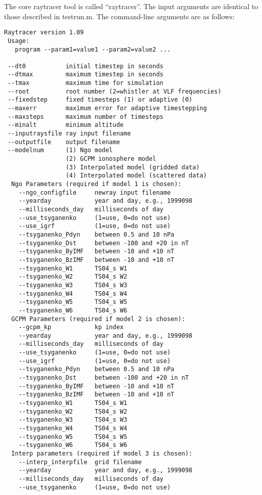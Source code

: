 \documentclass[10pt]{article}
\begin{document}
The core raytracer tool is called ``raytracer''.  The input arguments
are identical to those described in testrun.m.  The command-line
arguments are as follows:

\begin{verbatim}
Raytracer version 1.09
 Usage:
   program --param1=value1 --param2=value2 ...
   
 --dt0           initial timestep in seconds
 --dtmax         maximum timestep in seconds
 --tmax          maximum time for simulation
 --root          root number (2=whistler at VLF frequencies)
 --fixedstep     fixed timesteps (1) or adaptive (0)
 --maxerr        maximum error for adaptive timestepping
 --maxsteps      maximum number of timesteps
 --minalt        minimum altitude
 --inputraysfile ray input filename
 --outputfile    output filename
 --modelnum      (1) Ngo model
                 (2) GCPM ionosphere model
                 (3) Interpolated model (gridded data)
                 (4) Interpolated model (scattered data)
  Ngo Parameters (required if model 1 is chosen):
    --ngo_configfile     newray input filename
    --yearday            year and day, e.g., 1999098
    --milliseconds_day   milliseconds of day
    --use_tsyganenko     (1=use, 0=do not use)
    --use_igrf           (1=use, 0=do not use)
    --tsyganenko_Pdyn    between 0.5 and 10 nPa
    --tsyganenko_Dst     between -100 and +20 in nT
    --tsyganenko_ByIMF   between -10 and +10 nT
    --tsyganenko_BzIMF   between -10 and +10 nT
    --tsyganenko_W1      TS04_s W1
    --tsyganenko_W2      TS04_s W2
    --tsyganenko_W3      TS04_s W3
    --tsyganenko_W4      TS04_s W4
    --tsyganenko_W5      TS04_s W5
    --tsyganenko_W6      TS04_s W6
  GCPM Parameters (required if model 2 is chosen):
    --gcpm_kp            kp index
    --yearday            year and day, e.g., 1999098
    --milliseconds_day   milliseconds of day
    --use_tsyganenko     (1=use, 0=do not use)
    --use_igrf           (1=use, 0=do not use)
    --tsyganenko_Pdyn    between 0.5 and 10 nPa
    --tsyganenko_Dst     between -100 and +20 in nT
    --tsyganenko_ByIMF   between -10 and +10 nT
    --tsyganenko_BzIMF   between -10 and +10 nT
    --tsyganenko_W1      TS04_s W1
    --tsyganenko_W2      TS04_s W2
    --tsyganenko_W3      TS04_s W3
    --tsyganenko_W4      TS04_s W4
    --tsyganenko_W5      TS04_s W5
    --tsyganenko_W6      TS04_s W6
  Interp parameters (required if model 3 is chosen):
    --interp_interpfile  grid filename
    --yearday            year and day, e.g., 1999098
    --milliseconds_day   milliseconds of day
    --use_tsyganenko     (1=use, 0=do not use)

\end{verbatim}
\end{document}
